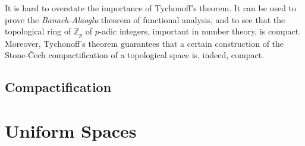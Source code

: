 \documentclass{book}
\theoremstyle{definition}
\theoremstyle{remark}
\newcommand{\Z}{\mathbb{Z}}
\begin{document}
It is hard to overstate the importance of Tychonoff's theorem. It can be used to prove the \textit{Banach-Alaoglu} theorem of functional analysis, and to see that the topological ring of $\Z_p$ of $p$-adic integers, important in number theory, is compact. Moreover, Tychonoff's theorem guarantees that a certain construction of the Stone-Čech compactification of a topological space is, indeed, compact.

\section{Compactification}

\chapter{Uniform Spaces}

\end{document}

